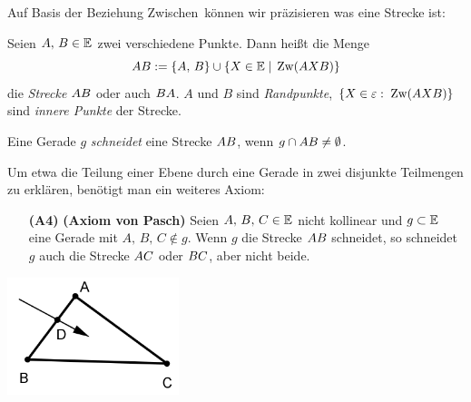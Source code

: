 

Auf Basis der Beziehung \glqq Zwischen\grqq\ können wir präzisieren was eine
Strecke ist:

\begin{defi}[Strecke]
Seien $A,\,B\in \mathbb E$ zwei verschiedene
Punkte. Dann hei{\ss}t die Menge
\[
{AB}:=\{A,\,B\}\cup\{X\in\mathbb E \; | \;\operatorname{Zw}(AXB)\}
\] 
die {\em Strecke} ${AB}$ oder auch ${BA}$. 
$A$ und $B$ sind {\em Randpunkte},
$\{X\in\varepsilon:\;\operatorname{Zw}(AXB)\}$ sind {\em innere Punkte} der Strecke.
\end{defi}


Eine Gerade $g$ \emph{schneidet} eine Strecke ${AB}$, wenn $g\cap{AB}\neq \emptyset$.


Um etwa die Teilung einer Ebene durch eine Gerade in zwei
disjunkte Teilmengen 
zu erkl\"{a}ren, 
ben\"{o}tigt man ein weiteres Axiom:



\begin{enumerate}
    \item[{\bf (A4)}] {\bf (Axiom von Pasch)} Seien $A,\,B,\,C\in\mathbb E$
    nicht kollinear und $g\subset\mathbb E$ eine Gerade mit
    $A,\,B,\,C\notin g$. Wenn $g$ die Strecke ${AB}$ schneidet, so schneidet
    $g$ auch die Strecke ${AC}$ oder ${BC}$, aber nicht
    beide. 
\end{enumerate}


\centerline{\includegraphics[width=5cm]{BILDER/1-1-04-Pasch.png}}





